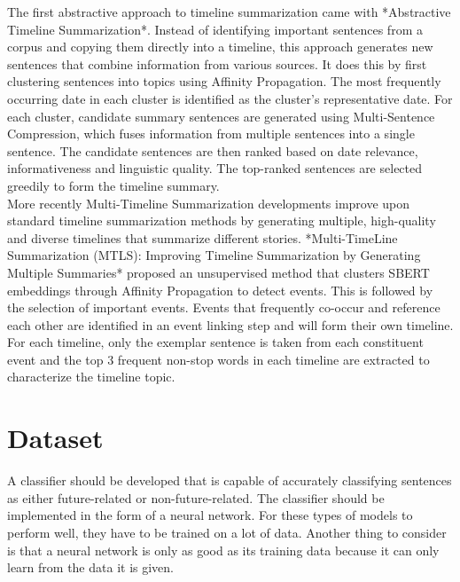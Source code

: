 \documentclass[a4paper,10pt]{report} %
\begin{document}
The first abstractive approach to timeline summarization came with *Abstractive Timeline Summarization*. Instead of identifying important sentences from a corpus and copying them directly into a timeline, this approach generates new sentences that combine information from various sources. It does this by first clustering sentences into topics using Affinity Propagation. The most frequently occurring date in each cluster is identified as the cluster's representative date. For each cluster, candidate summary sentences are generated using Multi-Sentence Compression, which fuses information from multiple sentences into a single sentence. The candidate sentences are then ranked based on date relevance, informativeness and linguistic quality. The top-ranked sentences are selected greedily to form the timeline summary. \\

More recently Multi-Timeline Summarization developments improve upon standard timeline summarization methods by generating multiple, high-quality and diverse timelines that summarize different stories. *Multi-TimeLine Summarization (MTLS): Improving Timeline Summarization by Generating Multiple Summaries* proposed an unsupervised method that clusters SBERT embeddings through Affinity Propagation to detect events. This is followed by the selection of important events. Events that frequently co-occur and reference each other are identified in an event linking step and will form their own timeline. For each timeline, only the exemplar sentence is taken from each constituent event and the top 3 frequent non-stop words in each timeline are extracted to characterize the timeline topic.



\chapter{Dataset}
A classifier should be developed that is capable of accurately classifying sentences as either future-related or non-future-related. The classifier should be implemented in the form of a neural network. For these types of models to perform well, they have to be trained on a lot of data. Another thing to consider is that a neural network is only as good as its training data because it can only learn from the data it is given. 
\end{document}

